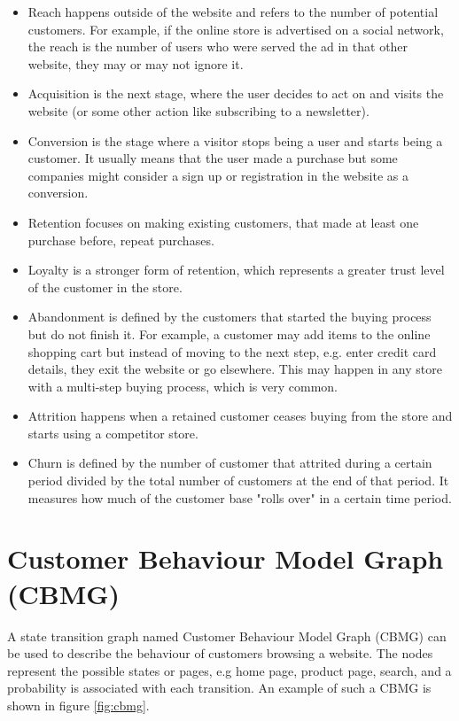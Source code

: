 \begin{itemize}
    \item Reach happens outside of the website and refers to the number of 
    potential customers. For example, if the online store is advertised on a 
    social network, the reach is the number of users who were served the ad in 
    that other website, they may or may not ignore it.
    \item Acquisition is the next stage, where the user decides to act on and 
    visits the website (or some other action like subscribing to a newsletter).
    \item Conversion is the stage where a visitor stops being a user and starts 
    being a customer. It usually means that the user made a purchase but some 
    companies might consider a sign up or registration in the website as a 
    conversion.
    \item Retention focuses on making existing customers, that made at least 
    one purchase before, repeat purchases.
    \item Loyalty is a stronger form of retention, which represents a greater 
    trust level of the customer in the store.
    \item Abandonment is defined by the customers that started the buying 
    process but do not finish it. For example, a customer may add items to the 
    online shopping cart but instead of moving to the next step, e.g. enter 
    credit card details, they exit the website or go elsewhere. This may happen 
    in any store with a multi-step buying process, which is very common.
    \item Attrition happens when a retained customer ceases buying from the 
    store and starts using a competitor store.
    \item Churn is defined by the number of customer that attrited during a 
    certain period divided by the total number of customers at the end of that 
    period. It measures how much of the customer base "rolls over" in a certain 
    time period.
\end{itemize}

\section{Customer Behaviour Model Graph (CBMG)}

A state transition graph named Customer Behaviour Model Graph (CBMG) can be 
used to describe the behaviour of customers browsing a website. The nodes 
represent the possible states or pages, e.g home page, product page, search, 
and a probability is associated with each transition. An example of such a CBMG 
is shown in figure \ref{fig:cbmg}.

